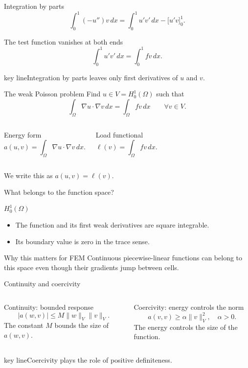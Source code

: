 \documentclass[aspectratio=169,11pt]{beamer}
\newcommand{\key}[1]{\par\vspace{4mm}\begin{beamercolorbox}[sep=2.5mm,wd=\textwidth]{key line}\normalsize #1\end{beamercolorbox}}
\begin{document}
\begin{frame}{Integration by parts}
\[
\int_0^1(-u'')v\,dx=\int_0^1u'v'\,dx-\big[u'v\big]_0^1.
\]\begin{exampleblock}{The test function vanishes at both ends}
\[
\boxed{\int_0^1u'v'\,dx=\int_0^1fv\,dx.}
\]
\end{exampleblock}\key{Integration by parts leaves only first derivatives of $u$ and $v$.}
\end{frame}

\begin{frame}{The weak Poisson problem}
Find $u\in V=H_0^1(\Omega)$ such that\[
\boxed{\int_\Omega\nabla u\cdot\nabla v\,dx=\int_\Omega f v\,dx\qquad\forall v\in V.}
\]\begin{columns}[c,onlytextwidth]
\begin{block}{Energy form}
\[
a(u,v)=\int_\Omega\nabla u\cdot\nabla v\,dx.
\]
\end{block}
\begin{exampleblock}{Load functional}
\[
\ell(v)=\int_\Omega fv\,dx.
\]
\end{exampleblock}
\end{columns}\centering We write this as $a(u,v)=\ell(v)$.
\end{frame}

\begin{frame}{What belongs to the function space?}
\begin{block}{$H_0^1(\Omega)$}
\begin{itemize}
\item The function and its first weak derivatives are square integrable.
\item Its boundary value is zero in the trace sense.
\end{itemize}
\end{block}\begin{exampleblock}{Why this matters for FEM}
Continuous piecewise-linear functions can belong to this space even though their gradients jump between cells.
\end{exampleblock}
\end{frame}

\begin{frame}{Continuity and coercivity}
\begin{columns}[c,onlytextwidth]
\begin{block}{Continuity: bounded response}
\[
|a(w,v)|\le M\|w\|_V\|v\|_V.
\]The constant $M$ bounds the size of $a(w,v)$.
\end{block}
\begin{exampleblock}{Coercivity: energy controls the norm}
\[
a(v,v)\ge\alpha\|v\|_V^2,\quad\alpha>0.
\]The energy controls the size of the function.
\end{exampleblock}
\end{columns}\key{Coercivity plays the role of positive definiteness.}
\end{frame}
\end{document}
